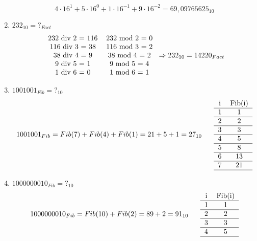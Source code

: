 \documentclass{article}
\begin{document}
\begin{enumerate}
$$          4\cdot16^{1} + 5\cdot16^{0} + 1\cdot16^{-1} + 9\cdot16^{-2}  =
          69,09765625_{10} $$
  \item $ 232_{10}         = ?_{Fact}$
        $$
          \begin{tabular}{cc}
            232 div 2 = 116 & 232 mod 2 = 0 \\
            116 div 3 = 38  & 116 mod 3 = 2 \\
            38 div 4 = 9    & 38 mod 4 = 2  \\
            9 div 5 = 1     & 9 mod 5 = 4   \\
            1 div 6 = 0     & 1 mod 6 = 1   \\
          \end{tabular}
          \Rightarrow
          232_{10} = 14220_{Fact}
        $$
  \item $ 1001001_{Fib}    = ?_{10}$
        $$
          1001001_{Fib} = Fib(7) + Fib(4) + Fib(1) = 21 + 5 + 1 = 27_{10}
          \;\;\;\;\;\;\;\\
          \begin{tabular}{cc}
            i & Fib(i) \\
            \hline
            1 & 1      \\
            \hline
            2 & 2      \\
            \hline
            3 & 3      \\
            \hline
            4 & 5      \\
            \hline
            5 & 8      \\
            \hline
            6 & 13     \\
            \hline
            7 & 21     \\
            \hline
          \end{tabular}
        $$
  \item $ 1000000010_{Fib} = ?_{10}$
        $$
          1000000010_{Fib} = Fib(10) + Fib(2) = 89 + 2 = 91_{10}
          \;\;\;\;\;\;\;\\
          \begin{tabular}{cc}
            i  & Fib(i) \\
            \hline
            1  & 1      \\
            \hline
            2  & 2      \\
            \hline
            3  & 3      \\
            \hline
            4  & 5      \\
            \hline

\end{tabular}$$
\end{enumerate}
\end{document}
